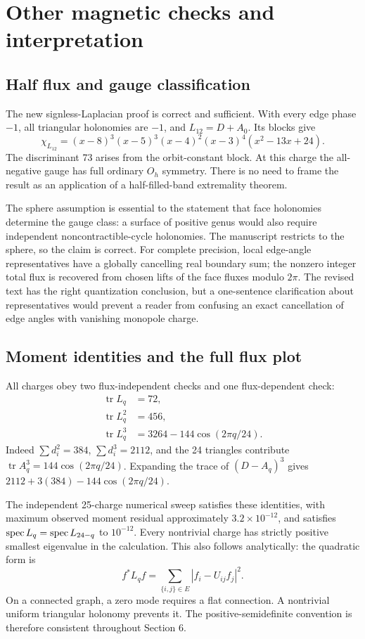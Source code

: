 \documentclass[11pt,a4paper]{article}
\newcommand{\tr}{\operatorname{tr}}\newcommand{\diag}{\operatorname{diag}}
\begin{document}
\section{Other magnetic checks and interpretation}
\subsection{Half flux and gauge classification}
The new signless-Laplacian proof is correct and sufficient. With every edge phase $-1$, all triangular holonomies are $-1$, and $L_{12}=D+A_0$. Its blocks give
\[
 \chi_{L_{12}}=(x-8)^3(x-5)^3(x-4)^2(x-3)^4(x^2-13x+24).
\]
The discriminant 73 arises from the orbit-constant block. At this charge the all-negative gauge has full ordinary $O_h$ symmetry. There is no need to frame the result as an application of a half-filled-band extremality theorem.

The sphere assumption is essential to the statement that face holonomies determine the gauge class: a surface of positive genus would also require independent noncontractible-cycle holonomies. The manuscript restricts to the sphere, so the claim is correct. For complete precision, local edge-angle representatives have a globally cancelling real boundary sum; the nonzero integer total flux is recovered from chosen lifts of the face fluxes modulo $2\pi$. The revised text has the right quantization conclusion, but a one-sentence clarification about representatives would prevent a reader from confusing an exact cancellation of edge angles with vanishing monopole charge.

\subsection{Moment identities and the full flux plot}
All charges obey two flux-independent checks and one flux-dependent check:
\begin{align}
 \tr L_q&=72,\\
 \tr L_q^2&=456,\\
 \tr L_q^3&=3264-144\cos(2\pi q/24).
\end{align}
Indeed $\sum d_i^2=384$, $\sum d_i^3=2112$, and the 24 triangles contribute $\tr A_q^3=144\cos(2\pi q/24)$. Expanding the trace of $(D-A_q)^3$ gives $2112+3(384)-144\cos(2\pi q/24)$.

The independent 25-charge numerical sweep satisfies these identities, with maximum observed moment residual approximately $3.2\times10^{-12}$, and satisfies $\operatorname{spec} L_q=\operatorname{spec} L_{24-q}$ to $10^{-12}$. Every nontrivial charge has strictly positive smallest eigenvalue in the calculation. This also follows analytically: the quadratic form is
\[
 f^*L_qf=\sum_{\{i,j\}\in E}|f_i-U_{ij}f_j|^2.
\]
On a connected graph, a zero mode requires a flat connection. A nontrivial uniform triangular holonomy prevents it. The positive-semidefinite convention is therefore consistent throughout Section 6.
\end{document}
